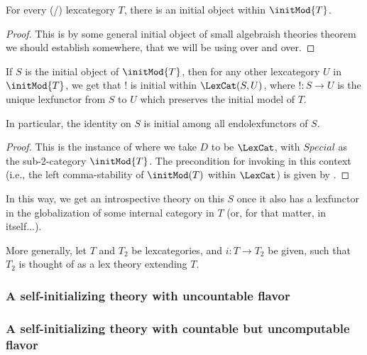 \begin{theorem}
For every (\setsmall/) lexcategory $T$, there is an initial object within $\initMod{T}$.
\end{theorem}
\begin{proof}
This is by some general initial object of small algebraish theories theorem  we should establish somewhere, that we will be using over and over. \TODO
\end{proof}

\begin{theorem}\label{InitialInitializerStrongSigmaesque}
If $S$ is the initial object of $\initMod{T}$, then for any other lexcategory $U$ in $\initMod{T}$, we get that $!$ is initial within $\LexCat(S, U)$, where $! : S \to U$ is the unique lexfunctor from $S$ to $U$ which preserves the initial model of $T$.

In particular, the identity on $S$ is initial among all endolexfunctors of $S$.
\end{theorem}
\begin{proof}
This is the instance of  where we take $D$ to be $\LexCat$, with $Special$ as the sub-2-category $\initMod{T}$. The precondition for invoking  in this context (i.e., the left comma-stability of $\initMod(T)$ within $\LexCat$) is given by .
\end{proof}

In this way, we get an introspective theory on this $S$ once it also has a lexfunctor in the globalization of some internal category in $T$ (or, for that matter, in itself...). \TODO

More generally, let $T$ and $T_2$ be lexcategories, and $i : T \to T_2$ be given, such that $T_2$ is thought of as a lex theory extending $T$. \TODO

\subsubsection{A self-initializing theory with uncountable flavor}

\subsubsection{A self-initializing theory with countable but uncomputable flavor}

